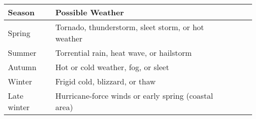 \begin{longtable}{llll}
\hline
\multicolumn{1}{|p{0.787in}|}{\begin{minipage}[t]{0.787in}\raggedright
\textbf{Season}\end{minipage}} & \multicolumn{1}{p{3.027in}|}{\begin{minipage}[t]{3.027in}\raggedright
\textbf{Possible Weather}\end{minipage}}\\
\hline
\multicolumn{1}{p{0.069in}|}{\begin{minipage}[t]{0.069in}\raggedright
Spring\end{minipage}} & \multicolumn{1}{p{0.069in}|}{\begin{minipage}[t]{0.069in}\raggedright
Tornado, thunderstorm, sleet storm, or hot weather\end{minipage}}\\
\hline
\multicolumn{1}{|p{0.787in}|}{\begin{minipage}[t]{0.787in}\raggedright
Summer\end{minipage}} & \multicolumn{1}{p{3.027in}|}{\begin{minipage}[t]{3.027in}\raggedright
Torrential rain, heat wave, or hailstorm\end{minipage}}\\
\hline
\multicolumn{1}{p{0.069in}|}{\begin{minipage}[t]{0.069in}\raggedright
Autumn\end{minipage}} & \multicolumn{1}{p{0.069in}|}{\begin{minipage}[t]{0.069in}\raggedright
Hot or cold weather, fog, or sleet\end{minipage}}\\
\hline
\multicolumn{1}{|p{0.787in}|}{\begin{minipage}[t]{0.787in}\raggedright
Winter\end{minipage}} & \multicolumn{3}{p{3.166in}|}{\begin{minipage}[t]{3.166in}\raggedright
Frigid cold, blizzard, or thaw\end{minipage}}\\
\hline
\multicolumn{1}{p{0.069in}|}{\begin{minipage}[t]{0.069in}\raggedright
Late winter\end{minipage}} & \multicolumn{1}{p{0.069in}|}{\begin{minipage}[t]{0.069in}\raggedright
Hurricane-force winds or early spring (coastal area)\end{minipage}}\\
\hline
\end{longtable}

